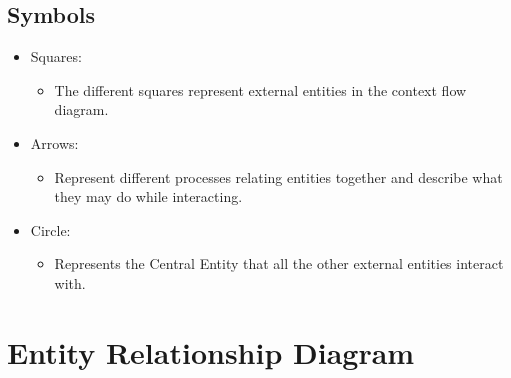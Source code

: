 \documentclass{article}
\begin{document}
\subsection{Symbols}
\begin{itemize}
\item Squares:
    \begin{itemize}
        \item The different squares represent external entities in the context flow diagram.
    \end{itemize}
\end{itemize}

\begin{itemize}
\item Arrows:
    \begin{itemize}
        \item Represent different processes relating entities together and describe what they may do while interacting.
    \end{itemize}
\end{itemize}

\begin{itemize}
\item Circle:
    \begin{itemize}
        \item Represents the Central Entity that all the other external entities interact with.
    \end{itemize}
\end{itemize}

\section{Entity Relationship Diagram}
\end{document}

